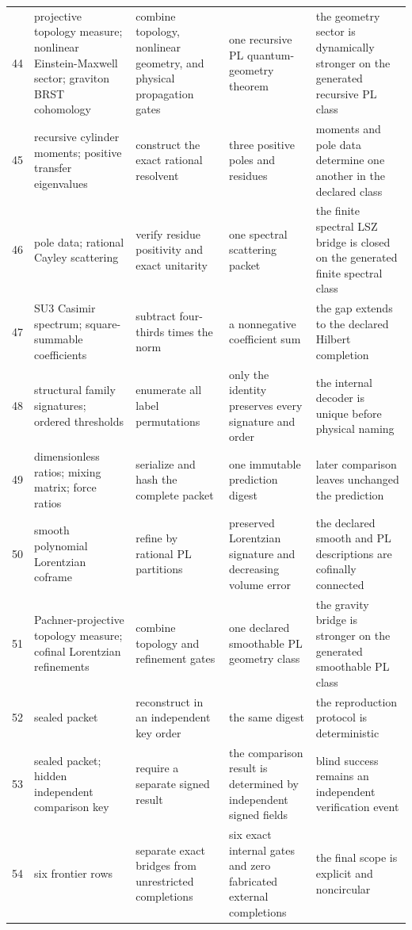 \documentclass[11pt]{article}
\numberwithin{equation}{section}
\theoremstyle{remark}
\begin{document}
\begin{landscape}
\begin{longtable}{p{0.65cm}p{3.5cm}p{4.0cm}p{4.0cm}p{4.6cm}}
44&projective topology measure; nonlinear Einstein-Maxwell sector; graviton BRST cohomology&combine topology, nonlinear geometry, and physical propagation gates&one recursive PL quantum-geometry theorem&the geometry sector is dynamically stronger on the generated recursive PL class\\
45&recursive cylinder moments; positive transfer eigenvalues&construct the exact rational resolvent&three positive poles and residues&moments and pole data determine one another in the declared class\\
46&pole data; rational Cayley scattering&verify residue positivity and exact unitarity&one spectral scattering packet&the finite spectral LSZ bridge is closed on the generated finite spectral class\\
47&SU3 Casimir spectrum; square-summable coefficients&subtract four-thirds times the norm&a nonnegative coefficient sum&the gap extends to the declared Hilbert completion\\
48&structural family signatures; ordered thresholds&enumerate all label permutations&only the identity preserves every signature and order&the internal decoder is unique before physical naming\\
49&dimensionless ratios; mixing matrix; force ratios&serialize and hash the complete packet&one immutable prediction digest&later comparison leaves unchanged the prediction\\
50&smooth polynomial Lorentzian coframe&refine by rational PL partitions&preserved Lorentzian signature and decreasing volume error&the declared smooth and PL descriptions are cofinally connected\\
51&Pachner-projective topology measure; cofinal Lorentzian refinements&combine topology and refinement gates&one declared smoothable PL geometry class&the gravity bridge is stronger on the generated smoothable PL class\\
52&sealed packet&reconstruct in an independent key order&the same digest&the reproduction protocol is deterministic\\
53&sealed packet; hidden independent comparison key&require a separate signed result&the comparison result is determined by independent signed fields&blind success remains an independent verification event\\
54&six frontier rows&separate exact bridges from unrestricted completions&six exact internal gates and zero fabricated external completions&the final scope is explicit and noncircular\\

\end{longtable}
\end{landscape}
\end{document}
